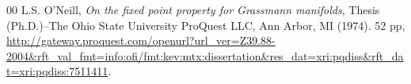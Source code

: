 \documentclass{amsart}
\begin{document}
\begin{thebibliography}{00}
 L.S. O'Neill, \textit{On the fixed point property for Grassmann manifolds}, Thesis (Ph.D.)--The Ohio State University ProQuest LLC, Ann Arbor, MI (1974). 52 pp, \url{http://gateway.proquest.com/openurl?url_ver=Z39.88-2004&rft_val_fmt=info:ofi/fmt:kev:mtx:dissertation&res_dat=xri:pqdiss&rft_dat=xri:pqdiss:7511411}.
\end{thebibliography}
\end{document}

